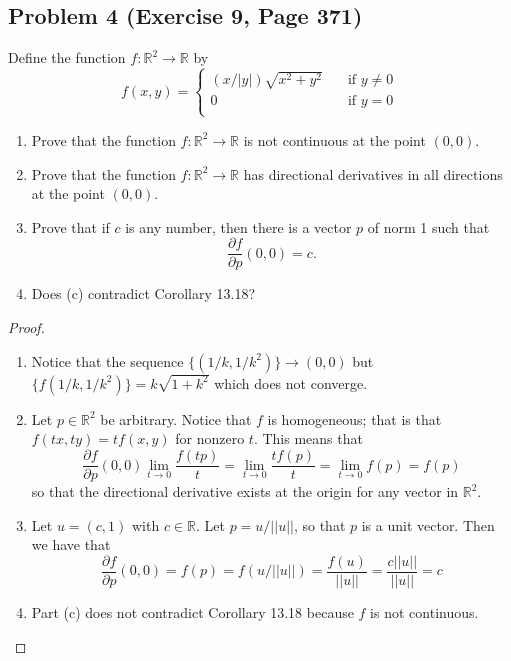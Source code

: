 \documentclass{article}
\begin{document}
\subsection*{Problem 4 (Exercise 9, Page 371)}
Define the function $f \colon \mathbb{R}^2 \to \mathbb{R}$ by 
\[ f(x, y) = \begin{cases}
          (x/|y|)\sqrt{x^2+y^2} \quad &\text{if $y \neq 0$} \\
          0 \quad &\text{if $y = 0$}\\
          \end{cases}\]
\begin{enumerate}[label=\alph*.]
    \item Prove that the function $f \colon \mathbb{R}^2 \to \mathbb{R}$ is not continuous at the point $(0, 0)$.
    \item Prove that the function $f \colon \mathbb{R}^2 \to \mathbb{R}$ has directional derivatives in all directions at the point $(0, 0)$.
    \item Prove that if $c$ is any number, then there is a vector $p$ of norm 1 such that 
    \[ \frac{\partial f}{\partial p}(0, 0) = c.\]
    \item Does (c) contradict Corollary 13.18?
\end{enumerate}
\begin{proof}
\qquad
\begin{enumerate}[label=\alph*.]
\item Notice that the sequence $\{(1/k, 1/k^2)\} \to (0, 0)$ but $\{f(1/k, 1/k^2)\} = k\sqrt{1+k^2}$ which does not converge.
\item Let $p \in \mathbb{R}^2$ be arbitrary. Notice that $f$ is homogeneous; that is that $f(tx, ty) = tf(x, y)$ for nonzero $t$. This means that
\[ \frac{\partial f}{\partial p}(0, 0) \lim_{t \to 0} \frac{f(tp)}{t} = \lim_{t \to 0} \frac{tf(p)}{t} = \lim_{t \to 0} f(p) = f(p)\]
so that the directional derivative exists at the origin for any vector in $\mathbb{R}^2$.
\item Let $u = (c, 1)$ with $c \in \mathbb{R}$. Let $p = u/||u||$, so that $p$ is a unit vector. Then we have that
\[ \frac{\partial f}{\partial p}(0, 0) = f(p) = f(u/||u||) = \frac{f(u)}{||u||} = \frac{c||u||}{||u||} = c\]
\item Part (c) does not contradict Corollary 13.18 because $f$ is not continuous.
\end{enumerate}

\end{proof}
\end{document}
